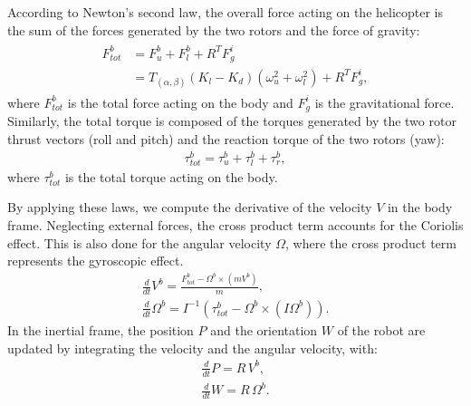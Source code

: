 According to Newton's second law, the overall force acting on the helicopter is the sum of the forces generated by the two rotors and the force of gravity:
\begin{gather*}
    \begin{split}
        F^b_{tot} & = F^b_u + F^b_l + R^T F^i_g \\
        & = T_{(\alpha, \beta)} (K_l - K_d) (\omega^2_u + \omega^2_l)+ R^T F^i_g,
    \end{split}
\end{gather*}
where \(F^b_{tot}\) is the total force acting on the body and \(F^i_{g}\) is the gravitational force.
Similarly, the total torque is composed of the torques generated by the two rotor thrust vectors (roll and pitch) and the reaction torque of the two rotors (yaw):
\begin{align}
    \tau^b_{tot} = \tau^b_u + \tau^b_l + \tau^b_r,
    \label{eq:torque}
\end{align}
where $\tau_{tot}^b$ is the total torque acting on the body.

By applying these laws, we compute the derivative of the velocity $V$ in the body frame. Neglecting external forces, the cross product term accounts for the Coriolis effect.
This is also done for the angular velocity $\Omega$, where the cross product term represents the gyroscopic effect.
\begin{gather*}
    \frac{d}{dt}{V^b} = \frac{F^b_{tot} - \Omega^b \times (m V^b)}{m}, \\
    \frac{d}{dt}{\Omega^b} = I^{-1} (\tau^b_{tot} - \Omega^b \times (I \Omega^b)).
\end{gather*}
In the inertial frame, the position $P$ and the orientation $W$ of the robot are updated by integrating the velocity and the angular velocity, with:
\begin{gather*}
    \frac{d}{dt}P = R\, V^b, \\ 
    \frac{d}{dt}W = R\, \Omega^b.
\end{gather*}